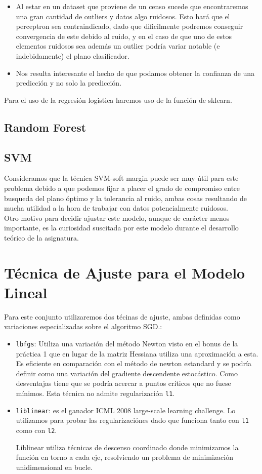 \documentclass[11pt,a4paper]{article}
\begin{document}
	\begin{itemize}
	\item Al estar en un dataset que proviene de un censo sucede que encontraremos una gran cantidad de outliers y datos algo ruidosos. Esto hará que el perceptron sea contraindicado, dado que dificilmente podremos conseguir convergencia de este debido al ruido, y en el caso de que uno de estos elementos ruidosos sea además un outlier podría variar notable (e indebidamente) el plano clasificador.
	\item Nos resulta interesante el hecho de que podamos obtener la confianza de una predicción y no solo la predicción.
\end{itemize}

Para el uso de la regresión logistica haremos uso de la función de sklearn. 

\subsection{Random Forest}

\subsection{SVM}

Consideramos que la técnica SVM-soft margin puede ser muy útil para este problema debido a que podemos fijar a placer el grado de compromiso entre busqueda del plano óptimo y la tolerancia al ruido, ambas cosas resultando de mucha utilidad a la hora de trabajar con datos potencialmente ruidosos.\\

Otro motivo para decidir ajustar este modelo, aunque de carácter menos importante, es la curiosidad suscitada por este modelo durante el desarrollo teórico de la asignatura. 

\section{ Técnica de Ajuste para el Modelo Lineal}
Para este conjunto utilizaremos dos técinas de ajuste, ambas definidas como variaciones especializadas sobre el algoritmo SGD.:
\begin{itemize}
	\item \texttt{lbfgs}: Utiliza una variación del método Newton visto en el bonus de la práctica 1 que en lugar de la matriz Hessiana utiliza una aproximación a esta. Es eficiente en comparación con el método de newton estandard y se podría definir como una variación del gradiente descendente estocástico. Como desventajas tiene que se podría acercar a puntos críticos que no fuese mínimos. Esta técnica no admite regularización \texttt{l1}.
	\item \texttt{liblinear}: es el ganador ICML 2008 large-scale learning challenge. Lo utilizamos para probar las regularizaciónes dado que funciona tanto con \texttt{l1} como con \texttt{l2}.
	
	Liblinear utiliza técnicas de descenso coordinado\cite{CD} donde minimizamos la función en torno a cada eje, resolviendo un problema de minimización unidimensional en bucle. 
\end{itemize}
\end{document}
